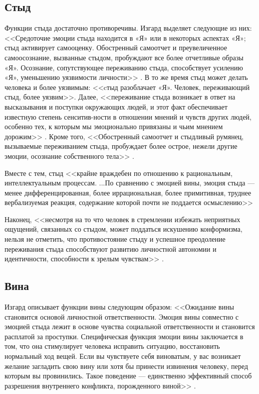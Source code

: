 \documentclass{../../common/thesisbyxetex}
\begin{document}
\subsection*{ Стыд}

Функции стыда достаточно противоречивы. Изгард выделяет следующие из них: <<Средоточие эмоции 
стыда находится в «Я» или в некоторых аспектах «Я»; стыд активирует самооценку.
Обостренный самоотчет и преувеличенное самоосознание, вызванные стыдом, пробуждают все более 
отчетливые образы «Я». Осознание, сопутствующее переживанию стыда, способствует усилению «Я», 
уменьшению уязвимости личности>> \cite[355]{izpsy}.
В то же время стыд может делать человека и более уязвимым: <<cтыд разоблачает «Я». Человек, 
переживающий стыд, более уязвим>>\cite[355]{izpsy}.
Далее, <<переживание стыда возникает в ответ на высказывания и поступки окружающих людей, и 
этот факт обеспечивает известную степень сенситив-ности в отношении мнений и чувств других людей, 
особенно тех, к которым мы эмоционально привязаны и чьим мнением дорожим>> \cite[355]{izpsy}.
Кроме того, 	<<Обостренный самоотчет и стыдливый румянец, вызываемые переживанием стыда, 
пробуждает более  острое, нежели другие эмоции, осознание собственного тела>> \cite[355]{izpsy}.
 
Вместе с тем, стыд <<крайне враждебен по отношению к рациональным, интеллектуальным процессам. 
...По сравнению с эмоцией вины, эмоция стыда — менее дифференцированная, более иррациональная, 
более 
примитивная, труднее вербализуемая реакция, содержание которой почти не поддается осмыслению>> 
\cite[355]{izpsy}

 Наконец, <<несмотря на то что человек в стремлении избежать неприятных ощущений, связанных со 
стыдом, может поддаться искушению конформизма, нельзя не отметить, что противостояние стыду и 
успешное преодоление переживания стыда способствуют развитию личностной автономии и идентичности, 
способности к зрелым чувствам>> \cite[355]{izpsy}. 

\subsection* { Вина}

Изгард описывает функции вины следующим образом: <<Ожидание вины становится основой личностной 
ответственности. Эмоция вины совместно с эмоцией стыда лежит в основе чувства социальной 
ответственности и становится расплатой за проступки.
Специфическая функция эмоции вины заключается в том, что она стимулирует человека исправить 
ситуацию, восстановить нормальный ход вещей. Если вы чувствуете себя виноватым, у вас возникает 
желание загладить свою вину или хотя бы принести извинения человеку, перед которым вы провинились. 
Такое поведение — единственно эффективный способ разрешения внутреннего конфликта, порожденного 
виной>> \cite[380]{izpsy}.
\end{document}
